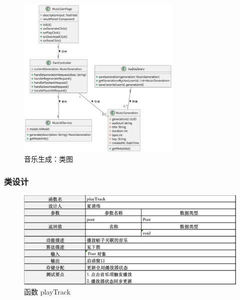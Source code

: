 \documentclass{base}
\numberwithin{figure}{section} %
\begin{document}
\begin{figure}[H]
    \centering
    \includegraphics[width=0.7\textwidth]{images/gen-2.png}
    \caption{音乐生成：类图}
\end{figure}

\subsubsection{类设计}

\begin{figure}[H]
    \centering
    \includegraphics[width=\textwidth]{images/class-table-1.png}
    \caption{函数 playTrack}
\end{figure}
\end{document}
